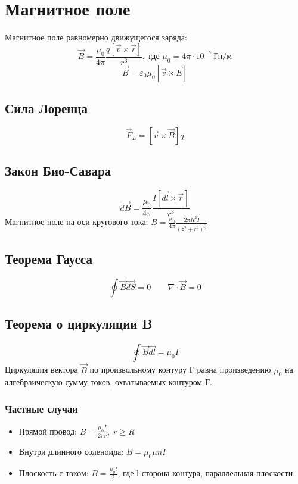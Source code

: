 \documentclass{article}
\begin{document}
\section{Магнитное поле}
Магнитное поле равномерно движущегося заряда:
\[
    \vec{B}=\frac{\mu_{0}}{4\pi}\frac{q[\vec{v}\times\vec{r}]}{r^3}
    ,\; \text{где } \mu_{0}=4\pi\cdot10^{-7} \, \text{Гн/м}
\]
\[\vec{B}=\varepsilon_{0}\mu_{0}[\vec{v}\times\vec{E}]\]

\subsection{Сила Лоренца}
\[
    \vec{F}_{L}=[\vec{v}\times\vec{B}]q
\]

\subsection{Закон Био-Савара}
\[\vec{dB}=\frac{\mu_{0}}{4\pi}\frac{I[\vec{dl}\times\vec{r}]}{r^3}\]
Магнитное поле на оси кругового тока: $B=\frac{\mu_{0}}{4\pi}\frac{2\pi R^2I}{(z^2+r^2)^{\frac{3}{2}}}$

\subsection{Теорема Гаусса}
\[\oint\vec{B}\vec{dS}=0 \qquad \nabla\cdot\vec{B}=0\]

\subsection{Теорема о циркуляции B}
\[\oint\vec{B}\vec{dl}=\mu_{0}I\]
Циркуляция вектора $\vec{B}$ по произвольному контуру Г равна произведению $\mu_{0}$ на алгебраическую сумму токов, охватываемых контуром Г.
\subsubsection{Частные случаи}
\begin{itemize}
    \item Прямой провод: $B=\frac{\mu_{0}I}{2\pi r}, \; r \ge R$
    \item Внутри длинного соленоида: $B=\mu_{0}\mu nI$
    \item Плоскость с током: $B=\frac{\mu_{0}l}{2}$, где l сторона контура, параллельная плоскости
\end{itemize}
\end{document}

